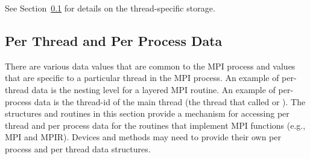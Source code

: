 \documentclass{article}
\begin{document}
See Section~\ref{sec:perthread} for details on the thread-specific storage.

\subsection{Per Thread and Per Process Data}
\label{sec:perthread}
There are various data values that are common to the MPI process and values
that are specific to a particular thread in the MPI process.  An example of
per-thread data is the nesting level for a layered MPI routine.  An example of
per-process data is the thread-id of the main thread (the thread that called
 or ).  
The structures and routines in this section provide a mechanism for
accessing per thread and per process data for the routines that
implement MPI functions (e.g., MPI and MPIR).  Devices and methods may
need to provide their own per process and per thread data structures.
\end{document}
